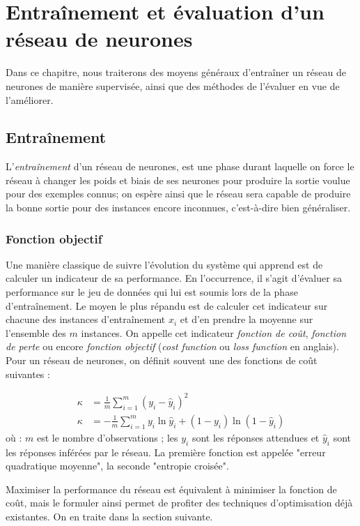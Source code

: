 \chapter{Entraînement et évaluation d'un réseau de neurones}\label{ch:ent_test_valid}

Dans ce chapitre, nous traiterons des moyens généraux d'entraîner un réseau de neurones de manière supervisée, ainsi que des méthodes de l'évaluer en vue de l'améliorer.

\section{Entraînement}
L'\emph{entraînement} d'un réseau de neurones, est une phase durant laquelle on force le réseau à changer les poids et biais de ses neurones pour produire la sortie voulue pour des exemples connus; on espère ainsi que le réseau sera capable de produire la bonne sortie pour des instances encore inconnues, c'est-à-dire bien généraliser.

\subsection{Fonction objectif}
Une manière classique de suivre l'évolution du système qui apprend est de calculer un indicateur de sa performance. En l'occurrence, il s'agit d'évaluer sa performance sur le jeu de données qui lui est soumis lors de la phase d'entraînement. Le moyen le plus répandu est de calculer cet indicateur sur chacune des instances d'entraînement \(x_i\) et d'en prendre la moyenne sur l'ensemble des \(m\) instances. On appelle cet indicateur \emph{fonction de coût}, \emph{fonction de perte} ou encore \emph{fonction objectif} (\emph{cost function} ou \emph{loss function} en anglais). Pour un réseau de neurones, on définit souvent une des fonctions de coût suivantes :

\begin{align}
\kappa &= \frac{1}{m}\sum_{i = 1}^m (y_i - \hat{y}_i)^2\\
\kappa &= - \frac{1}{m}\sum_{i = 1}^m y_i \ln{\hat{y}_i} + (1 - y_i)\ln{(1 - \hat{y}_i)}
\end{align}
où : \(m\) est le nombre d'observations ; les \(y_i\) sont les réponses attendues et \(\hat{y}_i\) sont les réponses inférées par le réseau. La première fonction est appelée "erreur quadratique moyenne", la seconde "entropie croisée".

Maximiser la performance du réseau est équivalent à minimiser la fonction de coût, mais le formuler ainsi permet de profiter des techniques d'optimisation déjà existantes. On en traite dans la section suivante.

